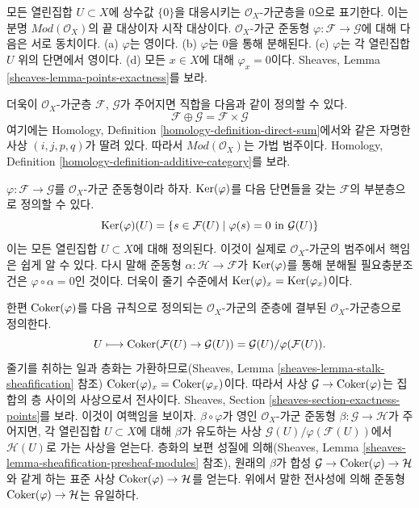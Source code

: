 \medskip\noindent
모든 열린집합 $U \subset X$에 상수값 $\{0\}$을 대응시키는
$\mathcal{O}_X$-가군층을 $0$으로 표기한다. 이는 분명
$\textit{Mod}(\mathcal{O}_X)$의 끝 대상이자 시작 대상이다.
$\mathcal{O}_X$-가군 준동형 $\varphi : \mathcal{F} \to \mathcal{G}$에 대해
다음은 서로 동치이다. (a) $\varphi$는 영이다. (b) $\varphi$는 $0$을 통해
분해된다. (c) $\varphi$는 각 열린집합 $U$ 위의 단면에서 영이다.
(d) 모든 $x \in X$에 대해 $\varphi_x = 0$이다. Sheaves, Lemma
\ref{sheaves-lemma-points-exactness}를 보라.

\medskip\noindent
더욱이 $\mathcal{O}_X$-가군층 $\mathcal{F}$, $\mathcal{G}$가 주어지면
직합을 다음과 같이 정의할 수 있다.
$$
\mathcal{F} \oplus \mathcal{G} = \mathcal{F} \times \mathcal{G}
$$
여기에는 Homology, Definition \ref{homology-definition-direct-sum}에서와 같은
자명한 사상 $(i, j, p, q)$가 딸려 있다. 따라서 $\textit{Mod}(\mathcal{O}_X)$는
가법 범주이다. Homology, Definition
\ref{homology-definition-additive-category}를 보라.

\medskip\noindent
$\varphi : \mathcal{F} \to \mathcal{G}$를 $\mathcal{O}_X$-가군 준동형이라 하자.
$\mathop{\mathrm{Ker}}(\varphi)$를 다음 단면들을 갖는 $\mathcal{F}$의 부분층으로 정의할 수 있다.
$$
\mathop{\mathrm{Ker}}(\varphi)(U) =
\{ s \in \mathcal{F}(U) \mid \varphi(s) = 0 \text{ in } \mathcal{G}(U)\}
$$
이는 모든 열린집합 $U \subset X$에 대해 정의된다. 이것이 실제로
$\mathcal{O}_X$-가군의 범주에서 핵임은 쉽게 알 수 있다. 다시 말해 준동형
$\alpha : \mathcal{H} \to \mathcal{F}$가 $\mathop{\mathrm{Ker}}(\varphi)$를 통해 분해될
필요충분조건은 $\varphi \circ \alpha = 0$인 것이다. 더욱이 줄기 수준에서
$\mathop{\mathrm{Ker}}(\varphi)_x = \mathop{\mathrm{Ker}}(\varphi_x)$이다.

\medskip\noindent
한편 $\mathop{\mathrm{Coker}}(\varphi)$를 다음 규칙으로 정의되는 $\mathcal{O}_X$-가군의
준층에 결부된 $\mathcal{O}_X$-가군층으로 정의한다.
$$
U
\longmapsto
\mathop{\mathrm{Coker}}(\mathcal{F}(U)\to \mathcal{G}(U)) =
\mathcal{G}(U)/\varphi(\mathcal{F}(U)).
$$
줄기를 취하는 일과 층화는 가환하므로(Sheaves, Lemma
\ref{sheaves-lemma-stalk-sheafification} 참조)
$\mathop{\mathrm{Coker}}(\varphi)_x = \mathop{\mathrm{Coker}}(\varphi_x)$이다. 따라서 사상
$\mathcal{G} \to \mathop{\mathrm{Coker}}(\varphi)$는 집합의 층 사이의 사상으로서 전사이다.
Sheaves, Section \ref{sheaves-section-exactness-points}를 보라.
이것이 여핵임을 보이자. $\beta \circ \varphi$가 영인 $\mathcal{O}_X$-가군
준동형 $\beta : \mathcal{G} \to \mathcal{H}$가 주어지면, 각 열린집합
$U \subset X$에 대해 $\beta$가 유도하는 사상
$\mathcal{G}(U)/\varphi(\mathcal{F}(U))$에서 $\mathcal{H}(U)$로 가는 사상을 얻는다.
층화의 보편 성질에 의해(Sheaves, Lemma
\ref{sheaves-lemma-sheafification-presheaf-modules} 참조), 원래의 $\beta$가 합성
$\mathcal{G} \to \mathop{\mathrm{Coker}}(\varphi) \to \mathcal{H}$와 같게 하는 표준 사상
$\mathop{\mathrm{Coker}}(\varphi) \to \mathcal{H}$를 얻는다. 위에서 말한 전사성에 의해
준동형 $\mathop{\mathrm{Coker}}(\varphi) \to \mathcal{H}$는 유일하다.

